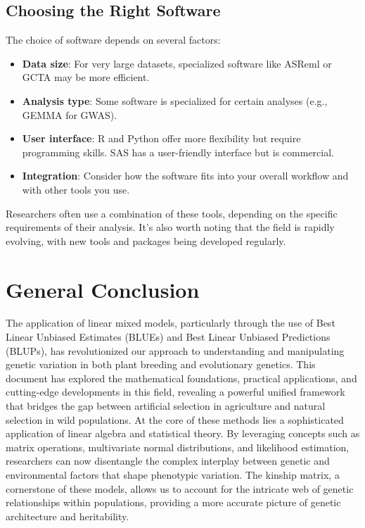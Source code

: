 \documentclass[12pt,a4paper]{article}
\begin{document}
\subsection{Choosing the Right Software}

The choice of software depends on several factors:

\begin{itemize}
    \item \textbf{Data size}: For very large datasets, specialized software like ASReml or GCTA may be more efficient.
    \item \textbf{Analysis type}: Some software is specialized for certain analyses (e.g., GEMMA for GWAS).
    \item \textbf{User interface}: R and Python offer more flexibility but require programming skills. SAS has a user-friendly interface but is commercial.
    \item \textbf{Integration}: Consider how the software fits into your overall workflow and with other tools you use.
\end{itemize}

Researchers often use a combination of these tools, depending on the specific requirements of their analysis. It's also worth noting that the field is rapidly evolving, with new tools and packages being developed regularly.

\section{General Conclusion}

The application of linear mixed models, particularly through the use of Best Linear Unbiased Estimates (BLUEs) and Best Linear Unbiased Predictions (BLUPs), has revolutionized our approach to understanding and manipulating genetic variation in both plant breeding and evolutionary genetics. This document has explored the mathematical foundations, practical applications, and cutting-edge developments in this field, revealing a powerful unified framework that bridges the gap between artificial selection in agriculture and natural selection in wild populations. At the core of these methods lies a sophisticated application of linear algebra and statistical theory. By leveraging concepts such as matrix operations, multivariate normal distributions, and likelihood estimation, researchers can now disentangle the complex interplay between genetic and environmental factors that shape phenotypic variation. The kinship matrix, a cornerstone of these models, allows us to account for the intricate web of genetic relationships within populations, providing a more accurate picture of genetic architecture and heritability.
\end{document}
